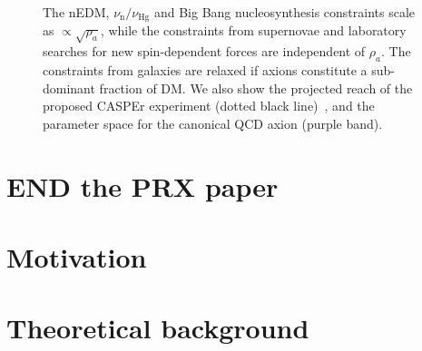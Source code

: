 \begin{figure}
{  The nEDM, {\color{black}$\nu_\mathrm{n} / \nu_\textrm{Hg}$} and Big Bang nucleosynthesis constraints scale as $\propto \sqrt{\rho_a}$, while the constraints from supernovae {\color{black}and laboratory searches for new spin-dependent forces} are independent of $\rho_a$.
  The constraints from galaxies are relaxed if axions constitute a sub-dominant fraction of DM.
  We also show the projected reach of the proposed CASPEr experiment (dotted black line)~\cite{CASPEr2014}, and the parameter space for the canonical QCD axion (purple band).
}
\label{fig:axion_limits_v2}
\end{figure}


\section{END the PRX paper}





\section{Motivation}


\section{Theoretical background}


